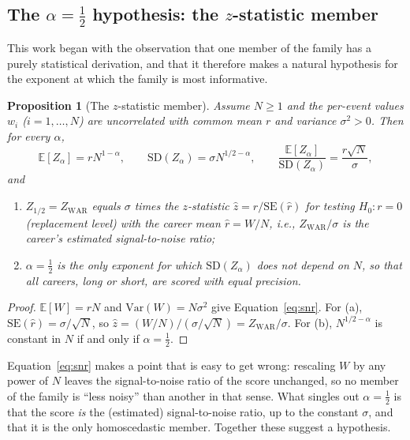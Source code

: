 \documentclass[11pt,letterpaper]{article}
\theoremstyle{plain}
\newtheorem{proposition}{Proposition}
\theoremstyle{definition}
\theoremstyle{remark}
\newcommand{\WAR}{\mathrm{WAR}}
\newcommand{\ZWAR}{Z_{\WAR}}
\newcommand{\SE}{\mathrm{SE}}
\newcommand{\SD}{\mathrm{SD}}
\newcommand{\Var}{\mathrm{Var}}
\newcommand{\E}{\mathbb{E}}
\begin{document}
\subsection{The \texorpdfstring{$\alpha = \tfrac12$}{alpha = 1/2} hypothesis: the \texorpdfstring{$z$}{z}-statistic member}
\label{sec:zstat}

This work began with the observation that one member of the family has a purely statistical derivation, and that it therefore makes a natural hypothesis for the exponent at which the family is most informative.

\begin{proposition}[The $z$-statistic member]
\label{prop:frequentist}
Assume $N \ge 1$ and the per-event values $w_i$ ($i = 1, \dots, N$) are uncorrelated with common mean $r$ and variance $\sigma^2 > 0$. Then for every $\alpha$,
\begin{equation}
    \E[Z_\alpha] = r N^{1-\alpha}, \qquad \SD(Z_\alpha) = \sigma N^{1/2-\alpha}, \qquad \frac{\E[Z_\alpha]}{\SD(Z_\alpha)} = \frac{r\sqrt N}{\sigma},
    \label{eq:snr}
\end{equation}
and
\begin{enumerate}
    \item[(a)] $Z_{1/2} = \ZWAR$ equals $\sigma$ times the $z$-statistic $\hat z = \hat r/\SE(\hat r)$ for testing $H_0\colon r = 0$ (replacement level) with the career mean $\hat r = W/N$, i.e., $\ZWAR/\sigma$ is the career's estimated signal-to-noise ratio;
    \item[(b)] $\alpha = \tfrac12$ is the only exponent for which $\SD(Z_\alpha)$ does not depend on $N$, so that all careers, long or short, are scored with equal precision.
\end{enumerate}
\end{proposition}

\begin{proof}
$\E[W] = rN$ and $\Var(W) = N\sigma^2$ give Equation~\eqref{eq:snr}. For (a), $\SE(\hat r) = \sigma/\sqrt{N}$, so $\hat z = (W/N)/(\sigma/\sqrt N) = \ZWAR/\sigma$. For (b), $N^{1/2-\alpha}$ is constant in $N$ if and only if $\alpha = \tfrac12$.
\end{proof}

Equation~\eqref{eq:snr} makes a point that is easy to get wrong: rescaling $W$ by any power of $N$ leaves the signal-to-noise ratio of the score unchanged, so no member of the family is ``less noisy'' than another in that sense. What singles out $\alpha = \tfrac12$ is that the score \emph{is} the (estimated) signal-to-noise ratio, up to the constant $\sigma$, and that it is the only homoscedastic member. Together these suggest a hypothesis.
\end{document}
